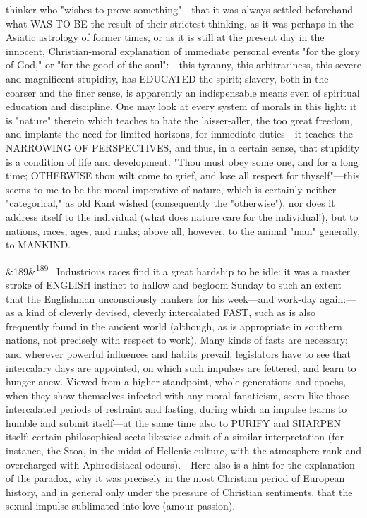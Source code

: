 \documentclass[12pt]{article}
\newcommand{\para}[1][]{\par\noindent\ifx&#1&\else\textsuperscript{\footnotesize #1}~\fi}
\begin{document}
thinker who "wishes to prove something"---that it was always settled beforehand what WAS TO BE the result of their strictest thinking, as it was perhaps in the Asiatic astrology of former times, or as it is still at the present day in the innocent, Christian-moral explanation of immediate personal events "for the glory of God," or "for the good of the soul":---this tyranny, this arbitrariness, this severe and magnificent stupidity, has EDUCATED the spirit; slavery, both in the coarser and the finer sense, is apparently an indispensable means even of spiritual education and discipline. One may look at every system of morals in this light: it is "nature" therein which teaches to hate the laisser-aller, the too great freedom, and implants the need for limited horizons, for immediate duties---it teaches the NARROWING OF PERSPECTIVES, and thus, in a certain sense, that stupidity is a condition of life and development. "Thou must obey some one, and for a long time; OTHERWISE thou wilt come to grief, and lose all respect for thyself"---this seems to me to be the moral imperative of nature, which is certainly neither "categorical," as old Kant wished (consequently the "otherwise"), nor does it address itself to the individual (what does nature care for the individual!), but to nations, races, ages, and ranks; above all, however, to the animal "man" generally, to MANKIND.

\para[189] Industrious races find it a great hardship to be idle: it was a master stroke of ENGLISH instinct to hallow and begloom Sunday to such an extent that the Englishman unconsciously hankers for his week---and work-day again:---as a kind of cleverly devised, cleverly intercalated FAST, such as is also frequently found in the ancient world (although, as is appropriate in southern nations, not precisely with respect to work). Many kinds of fasts are necessary; and wherever powerful influences and habits prevail, legislators have to see that intercalary days are appointed, on which such impulses are fettered, and learn to hunger anew. Viewed from a higher standpoint, whole generations and epochs, when they show themselves infected with any moral fanaticism, seem like those intercalated periods of restraint and fasting, during which an impulse learns to humble and submit itself---at the same time also to PURIFY and SHARPEN itself; certain philosophical sects likewise admit of a similar interpretation (for instance, the Stoa, in the midst of Hellenic culture, with the atmosphere rank and overcharged with Aphrodisiacal odours).---Here also is a hint for the explanation of the paradox, why it was precisely in the most Christian period of European history, and in general only under the pressure of Christian sentiments, that the sexual impulse sublimated into love (amour-passion).
\end{document}

